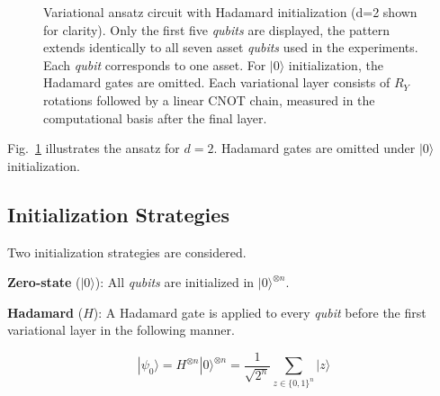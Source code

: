 \documentclass[runningheads]{llncs}
\begin{document}
\begin{figure}[t]
\centering
{}
\caption{Variational ansatz circuit with Hadamard initialization (d=2 shown for clarity). Only the first five \emph{qubits} are displayed, the pattern extends identically to all seven asset \emph{qubits} used in the experiments. Each \emph{qubit} 
corresponds to one asset. For $|0\rangle$ initialization, 
the Hadamard gates are omitted. Each variational layer 
consists of $R_Y$ rotations followed by a linear CNOT 
chain, measured in the computational basis 
after the final layer.}
\label{fig:circuit}
\end{figure}

Fig.~\ref{fig:circuit} illustrates the ansatz for \(d=2\). Hadamard gates are omitted under \(|0\rangle\) initialization.

\subsection{Initialization Strategies}

Two initialization strategies are considered.

\textbf{Zero-state} ($|0\rangle$): All \emph{qubits} are initialized in $|0\rangle^{\otimes n}$.

\textbf{Hadamard} ($H$): A Hadamard gate \cite{nielsen2010} is applied to every \emph{qubit} before the first variational layer in the following manner.

\begin{equation}
    |\psi_0\rangle = H^{\otimes n}|0\rangle^{\otimes n} 
    = \frac{1}{\sqrt{2^n}} \sum_{z \in \{0,1\}^n} |z\rangle
\end{equation}
\end{document}
